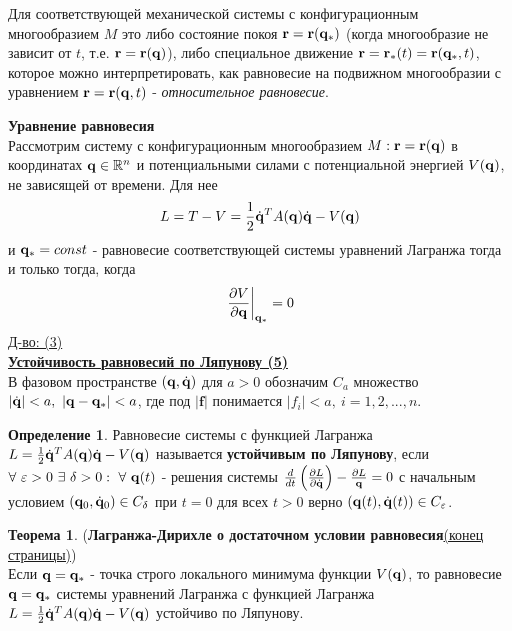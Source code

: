 \documentclass[specialist, subf, href, colorlinks=true, 12pt, times, mtpro, final]{disser}
\theoremstyle{definition}
\newtheorem{defn}{Определение}[section]
\newtheorem{theorem}{Теорема}[section]
\begin{document}
    	Для соответствующей механической системы с конфигурационным многообразием $M$ это либо состояние покоя $\mathbf{r} = \mathbf{r}(\mathbf{q}_*)$ (когда многообразие не зависит от $t$, т.е. $\mathbf{r}=\mathbf{r}(\mathbf{q})$), либо специальное движение $\mathbf{r} = \mathbf{r}_*(t) = \mathbf{r}(\mathbf{q}_*,t)$, которое можно интерпретировать, как равновесие на подвижном многообразии с уравнением $\mathbf{r}=\mathbf{r}(\mathbf{q},t)$ - \textit{относительное равновесие}.
    	
    	\textbf{Уравнение равновесия} \\
    	Рассмотрим систему с конфигурационным многообразием $M:\mathbf{r} = \mathbf{r}(\mathbf{q})$ в координатах $\mathbf{q} \in \mathbb{R}^n$ и потенциальными силами с потенциальной энергией $V(\mathbf{q})$, не зависящей от времени. Для нее 
    	$$
    		L = T - V = \frac{1}{2}\dot{\mathbf{q}}^T A(\mathbf{q}) \dot{\mathbf{q}} - V(\mathbf{q})
    	$$
    	и $\mathbf{q}_* = const$ - равновесие соответствующей системы уравнений Лагранжа тогда и только тогда, когда
    	$$
    		\left. \frac{\partial V}{\partial \mathbf{q}} \right|_{\mathbf{q}_*} = 0
    	$$
    	\hyperlink {lects.10}{Д-во: (3)} \\
    	
    	\textbf{\hyperlink {lects.10}{Устойчивость равновесий по Ляпунову (5)}} \\
    	В фазовом пространстве $(\mathbf{q},\dot{\mathbf{q}})$ для $a>0$ обозначим $C_a$ множество $|\dot{\mathbf{q}}| <a, \ |\mathbf{q}-\mathbf{q}_*| < a$, где под $|\textbf{f}|$ понимается $|f_i| < a, \ i = 1,2,...,n$.
    	\begin{defn}
    		Равновесие системы с функцией Лагранжа $L = \frac{1}{2}\dot{\mathbf{q}}^T A(\mathbf{q}) \dot{\mathbf{q}} - V(\mathbf{q})$ называется \textbf{устойчивым по Ляпунову}, если $\forall \ \varepsilon > 0 \ \exists \ \delta > 0 : \ \forall \ \mathbf{q}(t)$ - решения системы $\frac{d}{dt}\left( \frac{\partial L}{\partial \dot{\mathbf{q}}} \right) - \frac{\partial L}{\mathbf{q}} = 0$ с начальным условием $(\mathbf{q}_0, \dot{\mathbf{q}}_0)\in C_{\delta}$ при $t = 0$ для всех $t > 0$ верно $(\mathbf{q}(t), \dot{\mathbf{q}}(t)) \in C_{\varepsilon}$.
    	\end{defn}  
    
    	\begin{theorem}
    		(\textbf{Лагранжа-Дирихле о достаточном условии равновесия}\hyperlink {lects.10}{(конец страницы)}) \\
    		Если $\mathbf{q} = \mathbf{q}_*$ - точка строго локального минимума функции $V(\mathbf{q})$, то равновесие $\mathbf{q} = \mathbf{q}_*$ системы уравнений Лагранжа с функцией Лагранжа $L = \frac{1}{2}\dot{\mathbf{q}}^T A(\mathbf{q}) \dot{\mathbf{q}} - V(\mathbf{q})$ устойчиво по Ляпунову.
    	\end{theorem}
\end{document}

